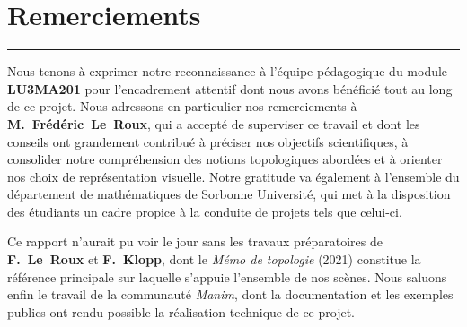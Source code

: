 \documentclass[12pt, a4paper, openany]{report}
\newcommand{\rapportannee}{Année universitaire 2024--2025}
\begin{document}
\begin{titlepage}
	\end{titlepage}
	
	\newpage\thispagestyle{empty}\mbox{}\newpage
	
	\chapter*{Remerciements}
	
	\begin{center}
		\color{SorbonneCiel}\rule{4cm}{0.8pt}
	\end{center}
	\vspace{0.5em}
	
	Nous tenons à exprimer notre reconnaissance à l’équipe pédagogique du module \textbf{LU3MA201} pour l’encadrement attentif dont nous avons bénéficié tout au long de ce projet. Nous adressons en particulier nos remerciements à \textbf{M.~Frédéric~Le~Roux}, qui a accepté de superviser ce travail et dont les conseils ont grandement contribué à préciser nos objectifs scientifiques, à consolider notre compréhension des notions topologiques abordées et à orienter nos choix de représentation visuelle. Notre gratitude va également à l’ensemble du département de mathématiques de Sorbonne Université, qui met à la disposition des étudiants un cadre propice à la conduite de projets tels que celui-ci.

	Ce rapport n’aurait pu voir le jour sans les travaux préparatoires de \textbf{F.~Le~Roux} et \textbf{F.~Klopp}, dont le \textit{Mémo de topologie} (2021) constitue la référence principale sur laquelle s’appuie l’ensemble de nos scènes. Nous saluons enfin le travail de la communauté \textit{Manim}, dont la documentation et les exemples publics ont rendu possible la réalisation technique de ce projet.
	
\end{document}
